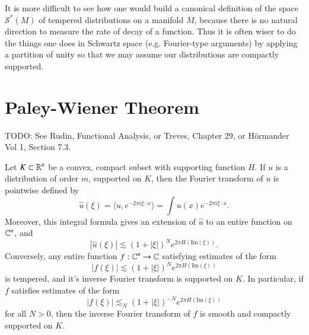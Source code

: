 It is more difficult to see how one would build a canonical definition of the space $\mathcal{S}^*(M)$ of tempered distributions on a manifold $M$, because there is no natural direction to measure the rate of decay of a function. Thus it is often wiser to do the things one does in Schwartz space (e.g. Fourier-type arguments) by applying a partition of unity so that we may assume our distributions are compactly supported.

\section{Paley-Wiener Theorem}

TODO: See Rudin, Functional Analysis, or Treves, Chapter 29, or H\"{o}rmander Vol 1, Section 7.3.

\begin{theorem}
    Let $K \subset \operatorname{\mathbb{R}}^n$ be a convex, compact subset with supporting function $H$. If $u$ is a distribution of order $m$, supported on $K$, then the Fourier transform of $u$ is pointwise defined by
    \[ \widehat{u}(\xi) = \langle u, e^{- 2 \pi i \xi \cdot x} \rangle = \int u(x) e^{-2 \pi i \xi \cdot x}. \]
    Moreover, this integral formula gives an extension of $\widehat{u}$ to an entire function on $\operatorname{\mathbb{C}}^n$, and
    \[ |\widehat{u}(\xi)| \lesssim (1 + |\xi|)^N e^{2 \pi H(\text{Im}(\xi))}. \]
    Conversely, any entire function $f: \operatorname{\mathbb{C}}^n \to \operatorname{\mathbb{C}}$ satisfying estimates of the form
    \[ |f(\xi)| \lesssim (1 + |\xi|)^N e^{2 \pi H(\text{Im}(\xi))} \]
    is tempered, and it's inverse Fourier transform is supported on $K$. In particular, if $f$ satisfies estimates of the form
    \[ |f(\xi)| \lesssim_N (1 + |\xi|)^{-N} e^{2 \pi H(\text{Im}(\xi))} \]
    for all $N > 0$, then the inverse Fourier transform of $f$ is smooth and compactly supported on $K$.
\end{theorem}
